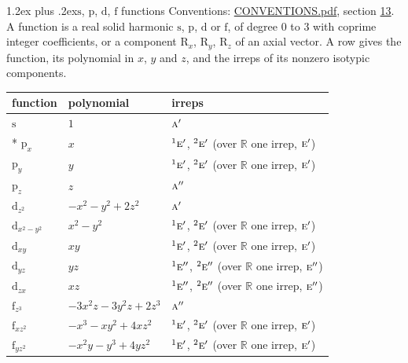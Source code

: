 \documentclass[10pt,a4paper]{article}
\makeatletter
\renewcommand\section{\@startsection{section}{1}{\z@}{-3ex plus -1ex minus -.2ex}%
  {1.2ex plus .2ex}{\normalfont\large\sffamily\bfseries\color{parttitle}}}
\numberwithin{equation}{section}
\newcommand{\irr}[1]{\text{\normalfont\scshape #1}}
\newcommand{\conjpair}[1]{{}^{#1}}
\newcommand{\orbital}[1]{\mathrm{#1}}
\makeatother
\begin{document}
\section{\texorpdfstring{$\orbital{s}$, $\orbital{p}$, $\orbital{d}$, $\orbital{f}$}{s, p, d, f} functions}\label{s:orbitals}
Conventions: \href{../../CONVENTIONS.pdf}{CONVENTIONS.pdf}, section \href{../../CONVENTIONS.pdf\#conv.13}{13}.
\leavevmode\label{n:head.function}A function is a real solid harmonic $\orbital{s}$, $\orbital{p}$, $\orbital{d}$ or $\orbital{f}$, of degree 0 to 3 with coprime integer coefficients, or a component $\orbital{R}_{x}$, $\orbital{R}_{y}$, $\orbital{R}_{z}$ of an axial vector. \label{n:head.polynomial}\label{n:head.irreps}A row gives the function, its polynomial in $x$, $y$ and $z$, and the irreps of its nonzero isotypic components.
{\small\begin{longtable}{@{}lll@{}}\toprule
function & polynomial & irreps\\\midrule\endhead
\bottomrule\endfoot\endlastfoot
$\orbital{s}$ & $1$ & $\irr{a}'$\\*
$\orbital{p}_{x}$ & $x$ & $\conjpair{1}\irr{e}'$, $\conjpair{2}\irr{e}'$ (over $\mathbb{R}$ one irrep, $\irr{e}'$)\\
$\orbital{p}_{y}$ & $y$ & $\conjpair{1}\irr{e}'$, $\conjpair{2}\irr{e}'$ (over $\mathbb{R}$ one irrep, $\irr{e}'$)\\
$\orbital{p}_{z}$ & $z$ & $\irr{a}''$\\
$\orbital{d}_{z^2}$ & $-x^{2} - y^{2} + 2z^{2}$ & $\irr{a}'$\\
$\orbital{d}_{x^2-y^2}$ & $x^{2} - y^{2}$ & $\conjpair{1}\irr{e}'$, $\conjpair{2}\irr{e}'$ (over $\mathbb{R}$ one irrep, $\irr{e}'$)\\
$\orbital{d}_{xy}$ & $xy$ & $\conjpair{1}\irr{e}'$, $\conjpair{2}\irr{e}'$ (over $\mathbb{R}$ one irrep, $\irr{e}'$)\\
$\orbital{d}_{yz}$ & $yz$ & $\conjpair{1}\irr{e}''$, $\conjpair{2}\irr{e}''$ (over $\mathbb{R}$ one irrep, $\irr{e}''$)\\
$\orbital{d}_{zx}$ & $xz$ & $\conjpair{1}\irr{e}''$, $\conjpair{2}\irr{e}''$ (over $\mathbb{R}$ one irrep, $\irr{e}''$)\\
$\orbital{f}_{z^3}$ & $-3x^{2}z - 3y^{2}z + 2z^{3}$ & $\irr{a}''$\\
$\orbital{f}_{xz^2}$ & $-x^{3} - xy^{2} + 4xz^{2}$ & $\conjpair{1}\irr{e}'$, $\conjpair{2}\irr{e}'$ (over $\mathbb{R}$ one irrep, $\irr{e}'$)\\
$\orbital{f}_{yz^2}$ & $-x^{2}y - y^{3} + 4yz^{2}$ & $\conjpair{1}\irr{e}'$, $\conjpair{2}\irr{e}'$ (over $\mathbb{R}$ one irrep, $\irr{e}'$)\\

\end{longtable}}
\end{document}
